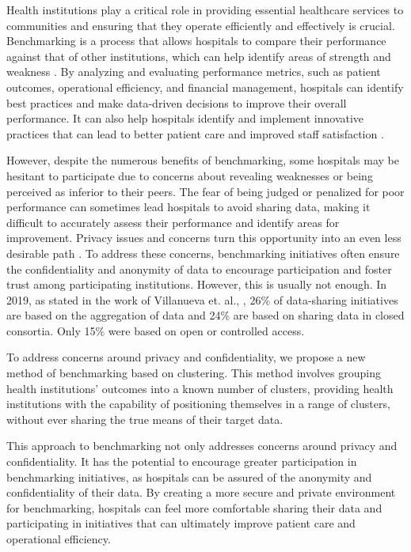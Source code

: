 Health institutions play a critical role in providing essential healthcare services to communities and ensuring that they operate efficiently and effectively is crucial. Benchmarking is a process that allows hospitals to compare their performance against that of other institutions, which can help identify areas of strength and weakness \cite{suydamPatientSafetyData2007}. By analyzing and evaluating performance metrics, such as patient outcomes, operational efficiency, and financial management, hospitals can identify best practices and make data-driven decisions to improve their overall performance. It can also help hospitals identify and implement innovative practices that can lead to better patient care and improved staff satisfaction \cite{hulsenSharingCaringData2020}.

However, despite the numerous benefits of benchmarking, some hospitals may be hesitant to participate due to concerns about revealing weaknesses or being perceived as inferior to their peers. The fear of being judged or penalized for poor performance can sometimes lead hospitals to avoid sharing data, making it difficult to accurately assess their performance and identify areas for improvement. Privacy issues and concerns turn this opportunity into an even less desirable path \cite{hulsenSharingCaringData2020}. To address these concerns, benchmarking initiatives often ensure the confidentiality and anonymity of data to encourage participation and foster trust among participating institutions. However, this is usually not enough. In 2019, as stated in the work of Villanueva et. al., \cite{villanuevaCharacterizingBiomedicalDataSharing2019}, 26\% of data-sharing initiatives are based on the aggregation of data and 24\% are based on sharing data in closed consortia. Only 15\% were based on open or controlled access.

To address concerns around privacy and confidentiality, we propose a new method of benchmarking based on clustering. This method involves grouping health institutions' outcomes into a known number of clusters, providing health institutions with the capability of positioning themselves in a range of clusters, without ever sharing the true means of their target data.

This approach to benchmarking not only addresses concerns around privacy and confidentiality. It has the potential to encourage greater participation in benchmarking initiatives, as hospitals can be assured of the anonymity and confidentiality of their data. By creating a more secure and private environment for benchmarking, hospitals can feel more comfortable sharing their data and participating in initiatives that can ultimately improve patient care and operational efficiency.


